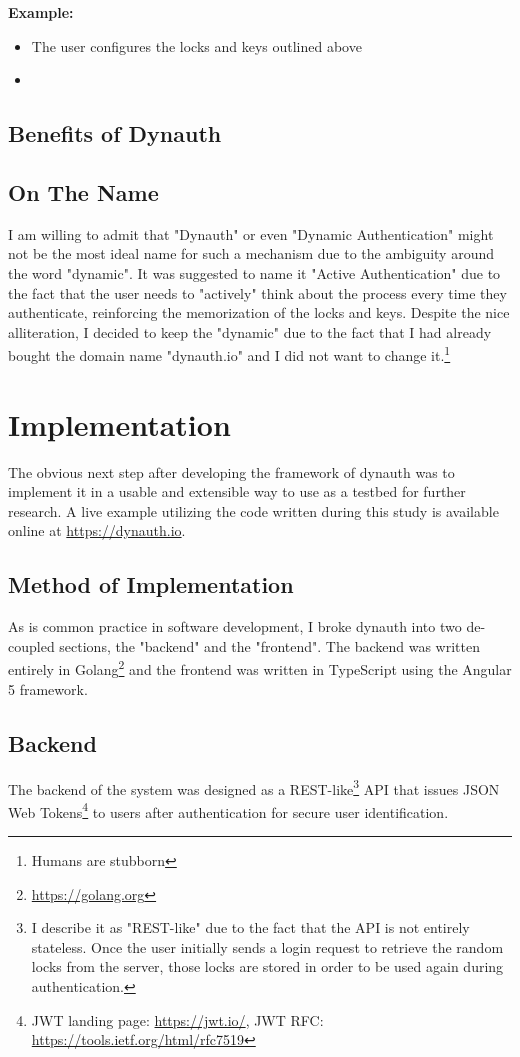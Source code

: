 \documentclass[conference]{IEEEtran}
\begin{document}
	\textbf{Example:}
	\begin{itemize}
		\item The user configures the locks and keys outlined above\
		\item 
	\end{itemize}

\subsection{Benefits of Dynauth}

\subsection{On The Name}
I am willing to admit that "Dynauth" or even "Dynamic Authentication" might not be the most ideal name for such a mechanism due to the ambiguity around the word "dynamic". It was suggested to name it "Active Authentication" due to the fact that the user needs to "actively" think about the process every time they authenticate, reinforcing the memorization of the locks and keys. Despite the nice alliteration, I decided to keep the "dynamic" due to the fact that I had already bought the domain name "dynauth.io" and I did not want to change it.\footnote{Humans are stubborn}
	
\section{Implementation}
	The obvious next step after developing the framework of dynauth was to implement it in a usable and extensible way to use as a testbed for further research. A live example utilizing the code written during this study is available online at \url{https://dynauth.io}.
\subsection{Method of Implementation}
	As is common practice in software development, I broke dynauth into two de-coupled sections, the "backend" and the "frontend". The backend was written entirely in Golang\footnote{\url{https://golang.org}} and the frontend was written in TypeScript using the Angular 5 framework.
\subsection{Backend}
	The backend of the system was designed as a REST-like\footnote{I describe it as "REST-like" due to the fact that the API is not entirely stateless. Once the user initially sends a login request to retrieve the random locks from the server, those locks are stored in order to be used again during authentication.} API that issues JSON Web Tokens\footnote{JWT landing page: \url{https://jwt.io/}, JWT RFC: \url{https://tools.ietf.org/html/rfc7519}} to users after authentication for secure user identification.
	
\end{document}
